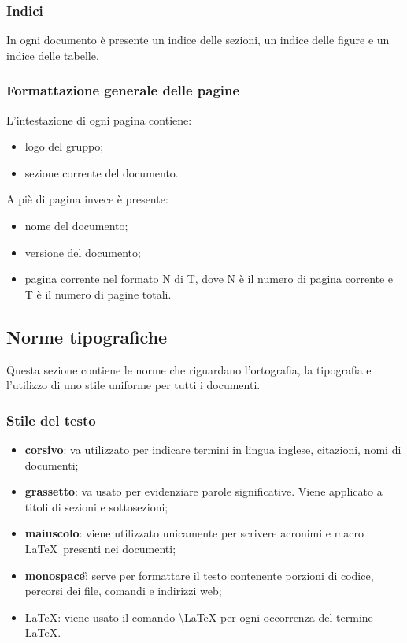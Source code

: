 \subsubsection{Indici}
In ogni documento è presente un indice delle sezioni, un indice delle figure e 
un indice delle tabelle.

\subsubsection{Formattazione generale delle pagine}
L'intestazione di ogni pagina contiene:
\begin{itemize}
	\item logo del gruppo;
	\item sezione corrente del documento.
\end{itemize}
A piè di pagina invece è presente:
\begin{itemize}
	\item nome del documento;
	\item versione del documento;
	\item pagina corrente nel formato N di T, dove N è il numero di pagina 
	corrente e T è il numero di pagine totali.
\end{itemize}

\subsection{Norme tipografiche}
Questa sezione contiene le norme che riguardano l'ortografia, la tipografia e l'utilizzo di uno stile uniforme per tutti i documenti.
\subsubsection{Stile del testo}
\begin{itemize}
	\item \textbf{corsivo}: va utilizzato per indicare termini in lingua inglese, citazioni, nomi di documenti;
	\item \textbf{grassetto}: va usato per evidenziare parole significative. Viene applicato a titoli di sezioni e sottosezioni;
	\item \textbf{maiuscolo}: viene utilizzato unicamente per scrivere acronimi e macro \LaTeX\ presenti nei documenti;
	\item \textbf{monospace}\G: serve per formattare il testo contenente porzioni di codice, percorsi dei file, comandi e indirizzi web;
	\item \LaTeX: viene usato il comando \textbackslash LaTeX per ogni occorrenza del termine \LaTeX.
\end{itemize}

